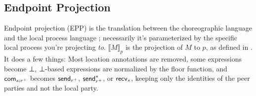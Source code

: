 \subsection{Endpoint Projection}\label{sec:projection}
Endpoint projection (EPP) is the translation between the choreographic language \HLSCentral
and the local process language \HLSLocal;
necessarily it's parameterized by the specific
local process you're projecting \emph{to}.
$⟦M⟧_p$ is the projection of $M$ to $p$, as defined in .
It does a few things:
Most location annotations are removed, some expressions become ⊥,
⊥-based expressions are normalized by the floor function,
and $\operatorname{\mathsf{com}}_{s;{r^{+}}}$ becomes $\operatorname{\mathsf{send}}_{{r^{+}}}$, $\operatorname{\mathsf{send}}_{{r^{+}}}^{\ast}$, or $\operatorname{\mathsf{recv}}_{s}$,
keeping only the identities of the peer parties and not the local party.

